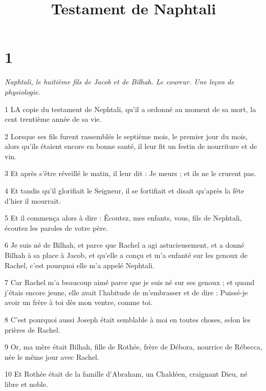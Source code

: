 

\title{Testament de Naphtali}

\chapter{1}

\par \textit{Naphtali, le huitième fils de Jacob et de Bilhah. Le coureur. Une leçon de physiologie.}

\par 1 LA copie du testament de Nephtali, qu'il a ordonné au moment de sa mort, la cent trentième année de sa vie.

\par 2 Lorsque ses fils furent rassemblés le septième mois, le premier jour du mois, alors qu'ils étaient encore en bonne santé, il leur fit un festin de nourriture et de vin.

\par 3 Et après s'être réveillé le matin, il leur dit : Je meurs ; et ils ne le crurent pas.

\par 4 Et tandis qu'il glorifiait le Seigneur, il se fortifiait et disait qu'après la fête d'hier il mourrait.

\par 5 Et il commença alors à dire : Écoutez, mes enfants, vous, fils de Nephtali, écoutez les paroles de votre père.

\par 6 Je suis né de Bilhah, et parce que Rachel a agi astucieusement, et a donné Bilhah à sa place à Jacob, et qu'elle a conçu et m'a enfanté sur les genoux de Rachel, c'est pourquoi elle m'a appelé Nephtali.

\par 7 Car Rachel m'a beaucoup aimé parce que je suis né sur ses genoux ; et quand j'étais encore jeune, elle avait l'habitude de m'embrasser et de dire : Puissé-je avoir un frère à toi dès mon ventre, comme toi.

\par 8 C'est pourquoi aussi Joseph était semblable à moi en toutes choses, selon les prières de Rachel.

\par 9 Or, ma mère était Bilhah, fille de Rothée, frère de Débora, nourrice de Rébecca, née le même jour avec Rachel.

\par 10 Et Rothée était de la famille d'Abraham, un Chaldéen, craignant Dieu, né libre et noble.

